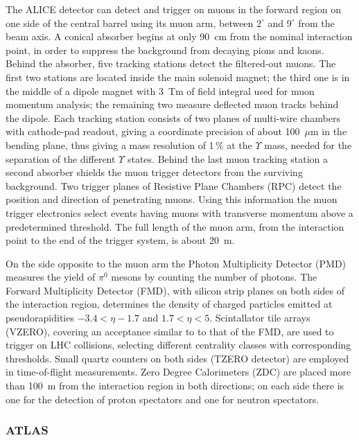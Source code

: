 The ALICE detector can detect and trigger on muons in the forward region on one side of the central barrel using its muon arm, between $2^\circ$ and $9^\circ$ from the beam axis. A conical absorber begins at only 90~cm from the nominal interaction point, in order to suppress the background from decaying pions and kaons. Behind the absorber, five tracking stations detect the filtered-out muons. The first two stations are located inside the main solenoid magnet; the third one is in the middle of a dipole magnet with 3~Tm of field integral used for muon momentum analysis; the remaining two measure deflected muon tracks behind the dipole. Each tracking station consists of two planes of multi-wire chambers with cathode-pad readout, giving a coordinate precision of about 100~$\mu$m in the bending plane, thus giving a mass resolution of 1\,\% at the $\Upsilon$ mass, needed for the separation of the different $\Upsilon$ states. Behind the last muon tracking station a second absorber shields the muon trigger detectors from the surviving  background. Two trigger planes of Resistive Plane Chambers (RPC) detect the position and direction of penetrating muons. Using this information the muon trigger electronics select events having muons with transverse momentum above a predetermined threshold. The full length of the muon arm, from the interaction point to the end of the trigger system, is about 20~m.

On the side opposite to the muon arm the Photon Multiplicity Detector (PMD) measures the yield of $\pi^0$ mesons by counting the number of photons. The Forward Multiplicity Detector (FMD), with silicon strip planes on both sides of the interaction region, determines the density of charged particles emitted at pseudorapidities $-3.4 < \eta -1.7$ and $1.7 < \eta < 5$. Scintallator tile arrays (VZERO), covering an acceptance similar to to that of the FMD, are used to trigger on LHC collisions, selecting different centrality classes with corresponding thresholds. Small quartz counters on both sides (TZERO detector) are employed in time-of-flight measurements. Zero Degree Calorimeters (ZDC) are placed more than 100~m from the interaction region in both directions; on each side there is one for the detection of proton spectators and one for neutron spectators.



\subsubsection{ATLAS}


